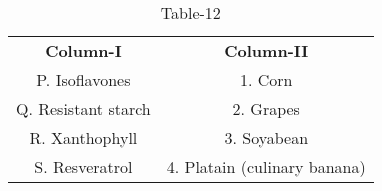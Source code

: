 \begin{table}[htbp]
  \centering
  \caption{Table-12}
  \label{tab:tables/table12.tex}
  \begin{tabular}{cc}
\textbf{Column-I} & \textbf{Column-II}\\

P. Isoflavones & 1. Corn \\
Q. Resistant starch & 2. Grapes \\
R. Xanthophyll & 3. Soyabean \\
S. Resveratrol & 4. Platain (culinary banana) \\
  
  
  
  \end{tabular}
\end{table}